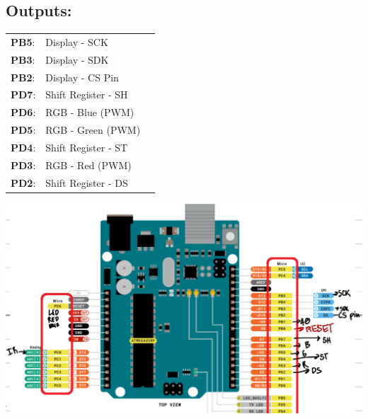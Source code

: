 \documentclass[12pt]{article}
\begin{document}
\subsection*{Outputs:}
\begin{minipage}{0.4\textwidth}
\begin{tabular}{ l l l }
   \textbf{PB5}: & Display - SCK \\
   \textbf{PB3}: & Display - SDK \\
   \textbf{PB2}: & Display - CS Pin \\
   \textbf{PD7}: & Shift Register - SH \\
   \textbf{PD6}: & RGB - Blue (PWM) \\
   \textbf{PD5}: & RGB - Green  (PWM) \\
   \textbf{PD4}: & Shift Register - ST \\
   \textbf{PD3}: & RGB - Red  (PWM) \\
   \textbf{PD2}: & Shift Register - DS \\
\end{tabular}
\end{minipage}%
\hfill
\begin{minipage}{0.6\textwidth}
    \centering
    \includegraphics[width=\textwidth]{arduinoDiagram.png}
\end{minipage}
\end{document}

